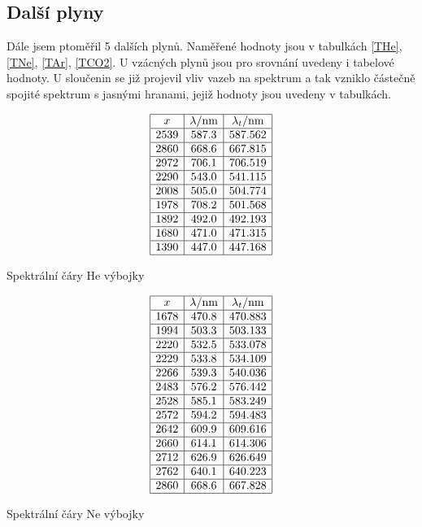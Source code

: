 \documentclass[a4paper,12pt]{article}
\begin{document}
\subsection{Další plyny}
Dále jsem ptoměřil 5 dalších plynů. Naměřené hodnoty jsou v tabulkách \ref{THe}, \ref{TNe}, \ref{TAr}, \ref{TCO2}. U vzácných plynů jsou pro srovnání uvedeny i tabelové hodnoty. U sloučenin se již projevil vliv vazeb na spektrum a tak vzniklo částečně spojité spektrum s jasnými hranami, jejiž hodnoty jsou uvedeny v tabulkách.

\begin{table}
$$
\begin{array}{|c|c|c|}
\hline
x&  \lambda/\mbox{nm}&  \lambda_t/\mbox{nm} \\ \hline
2539&   587.3&  587.562 \\ \hline
2860&   668.6&  667.815 \\ \hline
2972&   706.1&  706.519 \\ \hline
2290&   543.0&  541.115 \\ \hline
2008&   505.0&  504.774 \\ \hline
1978&   708.2&  501.568 \\ \hline
1892&   492.0&  492.193 \\ \hline
1680&   471.0&  471.315 \\ \hline
1390&   447.0&  447.168 \\ \hline
\end{array}
$$
\caption{Spektrální čáry He výbojky}
\label{THe}
\end{table}


\begin{table}
$$
\begin{array}{|c|c|c|}
\hline
x&  \lambda/\mbox{nm}&  \lambda_t/\mbox{nm} \\ \hline
1678&   470.8&  470.883 \\ \hline
1994&   503.3&  503.133 \\ \hline
2220&   532.5&  533.078 \\ \hline
2229&   533.8&  534.109 \\ \hline
2266&   539.3&  540.036 \\ \hline
2483&   576.2&  576.442 \\ \hline
2528&   585.1&  583.249 \\ \hline
2572&   594.2&  594.483 \\ \hline
2642&   609.9&  609.616 \\ \hline
2660&   614.1&  614.306 \\ \hline
2712&   626.9&  626.649 \\ \hline
2762&   640.1&  640.223 \\ \hline
2860&   668.6&  667.828 \\ \hline
\end{array}
$$
\caption{Spektrální čáry Ne výbojky}
\label{TNe}
\end{table}
\end{document}
